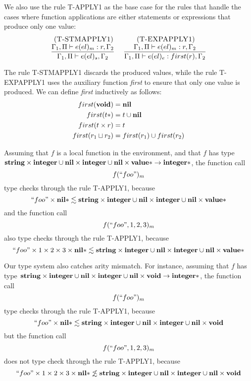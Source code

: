We also use the rule \textsc{T-APPLY1} as the base case for the rules
that handle the cases where function applications are either statements
or expressions that produce only one value:
\[
\begin{array}{c}
\begin{array}{c}
\; (\textsc{T-STMAPPLY1})\\
\dfrac{\Gamma_{1}, \Pi \vdash e(el)_{m}:r, \Gamma_{2}}
      {\Gamma_{1}, \Pi \vdash e(el)_{s},\Gamma_{2}}
\end{array}
\;
\begin{array}{c}
\; (\textsc{T-EXPAPPLY1})\\
\dfrac{\Gamma_{1}, \Pi \vdash e(el)_{m}:r, \Gamma_{2}}
      {\Gamma_{1}, \Pi \vdash e(el)_{e}:first(r), \Gamma_{2}}
\end{array}
\end{array}
\]

The rule \textsc{T-STMAPPLY1} discards the produced values,
while the rule \textsc{T-EXPAPPLY1} uses the auxiliary function
\emph{first} to ensure that only one value is produced.
We can define \emph{first} inductively as follows:
\begin{align*}
first(\mathbf{void}) & = \mathbf{nil}\\
first(t{*}) & = t \cup \mathbf{nil}\\
first(t \times r) & = t\\
first(r_{1} \sqcup r_{2}) & = first(r_{1}) \cup first(r_{2})
\end{align*}

Assuming that $f$ is a local function in the environment, and that $f$ has type
$\mathbf{string} \times \mathbf{integer} \cup \mathbf{nil} \times \mathbf{integer} \cup \mathbf{nil} \times \mathbf{value}{*} \rightarrow \mathbf{integer}{*}$,
the function call
\[
f(``foo")_{m}
\]
type checks through the rule \textsc{T-APPLY1}, because
\[
``foo" \times \mathbf{nil}{*} \lesssim \mathbf{string} \times \mathbf{integer} \cup \mathbf{nil} \times \mathbf{integer} \cup \mathbf{nil} \times \mathbf{value}{*}
\]
and the function call
\[
f(``foo",1,2,3)_{m}
\]
also type checks through the rule \textsc{T-APPLY1}, because
\[
``foo" \times 1 \times 2 \times 3 \times \mathbf{nil}{*} \lesssim \mathbf{string} \times \mathbf{integer} \cup \mathbf{nil} \times \mathbf{integer} \cup \mathbf{nil} \times \mathbf{value}{*}
\]

Our type system also catches arity mismatch.
For instance, assuming that $f$ has type
$\mathbf{string} \times \mathbf{integer} \cup \mathbf{nil} \times \mathbf{integer} \cup \mathbf{nil} \times \mathbf{void} \rightarrow \mathbf{integer}{*}$,
the function call
\[
f(``foo")_{m}
\]
type checks through the rule \textsc{T-APPLY1}, because
\[
``foo" \times \mathbf{nil}{*} \lesssim \mathbf{string} \times \mathbf{integer} \cup \mathbf{nil} \times \mathbf{integer} \cup \mathbf{nil} \times \mathbf{void}
\]
but the function call
\[
f(``foo",1,2,3)_{m}
\]
does not type check through the rule \textsc{T-APPLY1}, because
\[
``foo" \times 1 \times 2 \times 3 \times \mathbf{nil}{*} \not\lesssim \mathbf{string} \times \mathbf{integer} \cup \mathbf{nil} \times \mathbf{integer} \cup \mathbf{nil} \times \mathbf{void}
\]

